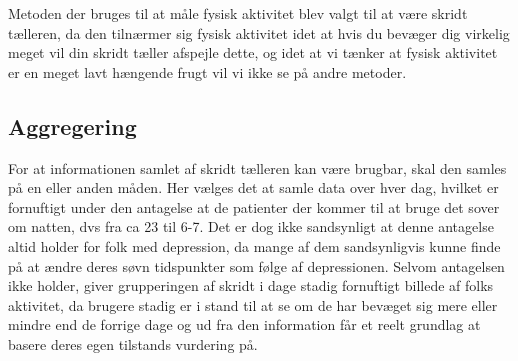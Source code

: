 Metoden der bruges til at måle fysisk aktivitet blev valgt til at være skridt tælleren, da den tilnærmer sig fysisk aktivitet idet at hvis du bevæger dig virkelig meget vil din skridt tæller afspejle dette, og idet at vi tænker at fysisk aktivitet er en meget lavt hængende frugt vil vi ikke se på andre metoder.

\subsection{Aggregering}
For at informationen samlet af skridt tælleren kan være brugbar, skal den samles på en eller anden måden.
Her vælges det at samle data over hver dag, hvilket er fornuftigt under den antagelse at de patienter der kommer til at bruge det sover om natten, dvs fra ca 23 til 6-7.
Det er dog ikke sandsynligt at denne antagelse altid holder for folk med depression, da mange af dem sandsynligvis kunne finde på at ændre deres søvn tidspunkter som følge af depressionen.
Selvom antagelsen ikke holder, giver grupperingen af skridt i dage stadig fornuftigt billede af folks aktivitet, da brugere stadig er i stand til at se om de har bevæget sig mere eller mindre end de forrige dage og ud fra den information får et reelt grundlag at basere deres egen tilstands vurdering på.